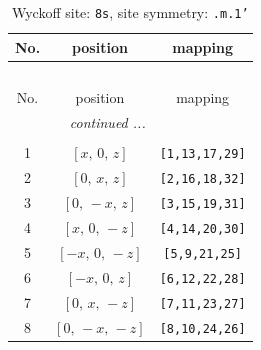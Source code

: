 \documentclass[fleqn,8pt]{jsarticle}
\begin{document}
\begin{longtable}{ccc}
\caption{Wyckoff site: {\tt 8s}, site symmetry: {\tt .m.1'}}
 \\
 \hline \hline
No. & position & mapping \\ \hline \endfirsthead

\multicolumn{2}{l}{\tablename\ \thetable{}} \\
 \hline \hline
No. & position & mapping \\ \hline \endhead

 \hline \hline
\multicolumn{2}{r}{\footnotesize\it continued ...} \\ \endfoot

 \hline \hline
\multicolumn{2}{r}{} \\ \endlastfoot

1 & $\left[ x,\, 0,\, z \right]$ & {\tt [1,13,17,29]} \\ \hline
2 & $\left[ 0,\, x,\, z \right]$ & {\tt [2,16,18,32]} \\ \hline
3 & $\left[ 0,\, - x,\, z \right]$ & {\tt [3,15,19,31]} \\ \hline
4 & $\left[ x,\, 0,\, - z \right]$ & {\tt [4,14,20,30]} \\ \hline
5 & $\left[ - x,\, 0,\, - z \right]$ & {\tt [5,9,21,25]} \\ \hline
6 & $\left[ - x,\, 0,\, z \right]$ & {\tt [6,12,22,28]} \\ \hline
7 & $\left[ 0,\, x,\, - z \right]$ & {\tt [7,11,23,27]} \\ \hline
8 & $\left[ 0,\, - x,\, - z \right]$ & {\tt [8,10,24,26]} \\
\end{longtable}
\renewcommand{\arraystretch}{1.2}
\end{document}
